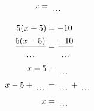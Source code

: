 \documentclass[12pt]{article}
\newcounter{minipagecount}
\begin{document}
\begin{multicols}{2}
\begin{minipage}[t]{0.45\textwidth}
\begin{align*}
        x &= \dotuline{\hspace{5mm}}\\
    \end{align*}
\end{minipage}\newpage
\noindent{(\theminipagecount)}\hspace{0.1mm} %
\begin{minipage}[t]{0.45\textwidth} %
    \vspace{-26pt}  %
    \raggedright %
    \begin{align*} %
        5(x - 5) &= -10\\
        \frac{5(x-5)}{\dotuline{\hspace{5mm}}} &= \frac{-10}{\dotuline{\hspace{5mm}}}\\
        x - 5 &= \dotuline{\hspace{5mm}}\\
        x - 5 + \dotuline{\hspace{5mm}} &= \dotuline{\hspace{5mm}} + \dotuline{\hspace{5mm}}\\
        x &= \dotuline{\hspace{5mm}}\\
    \end{align*}
\end{minipage} %
\noindent{(\theminipagecount)}\hspace{0.1mm} %
\begin{minipage}[t]{0.45\textwidth} %
    \vspace{-26pt}  %

\end{minipage}
\end{multicols}
\end{document}

